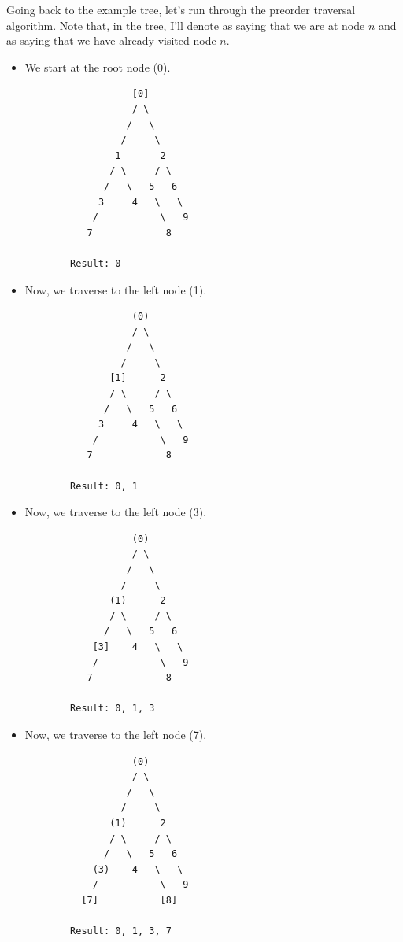 \documentclass[letterpaper]{article}
\begin{document}
Going back to the example tree, let's run through the preorder traversal algorithm. Note that, in the tree, I'll denote \code{[n]} as saying that we are at node $n$ and  as saying that we have already visited node $n$. 

\begin{itemize}
    \item We start at the root node (0). 
    \begin{verbatim}
                   [0]
                   / \
                  /   \
                 /     \
                1       2 
               / \     / \ 
              /   \   5   6
             3     4   \   \ 
            /           \   9
           7             8

        Result: 0
    \end{verbatim}

    \item Now, we traverse to the left node (1).
    \begin{verbatim}
                   (0)
                   / \
                  /   \
                 /     \
               [1]      2 
               / \     / \ 
              /   \   5   6
             3     4   \   \ 
            /           \   9
           7             8

        Result: 0, 1
    \end{verbatim}

    \item Now, we traverse to the left node (3).
    \begin{verbatim}
                   (0)
                   / \
                  /   \
                 /     \
               (1)      2 
               / \     / \ 
              /   \   5   6
            [3]    4   \   \ 
            /           \   9
           7             8

        Result: 0, 1, 3
    \end{verbatim}

    \item Now, we traverse to the left node (7).
    \begin{verbatim}
                   (0)
                   / \
                  /   \
                 /     \
               (1)      2 
               / \     / \ 
              /   \   5   6
            (3)    4   \   \ 
            /           \   9
          [7]           [8]

        Result: 0, 1, 3, 7
    \end{verbatim}


\end{itemize}
\end{document}

